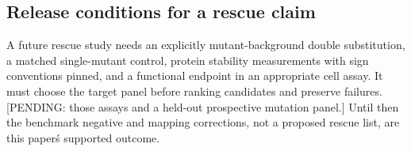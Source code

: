 \subsection{Release conditions for a rescue claim}
A future rescue study needs an explicitly mutant-background double substitution, a matched single-mutant control, protein stability measurements with sign conventions pinned, and a functional endpoint in an appropriate cell assay. It must choose the target panel before ranking candidates and preserve failures. [PENDING: those assays and a held-out prospective mutation panel.] Until then the benchmark negative and mapping corrections, not a proposed rescue list, are this paper\'s supported outcome.
